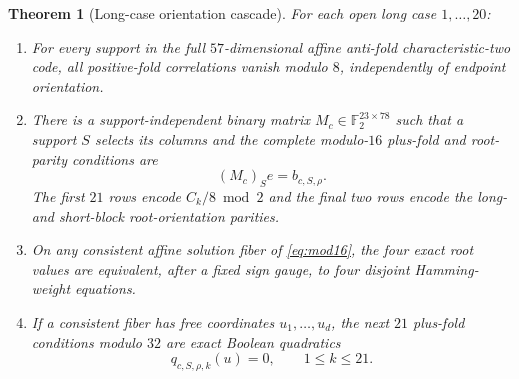 \documentclass[11pt]{article}
\newtheorem{theorem}{Theorem}[section]
\theoremstyle{remark}
\newcommand{\F}{\mathbb F}
\begin{document}
\begin{theorem}[Long-case orientation cascade]\label{thm:cascade}
For each open long case $1,\ldots,20$:
\begin{enumerate}
  \item For every support in the full $57$-dimensional affine anti-fold
        characteristic-two code, all positive-fold correlations vanish
        modulo $8$, independently of endpoint orientation.
  \item There is a support-independent binary matrix
        $M_c\in\F_2^{23\times78}$ such that a support $S$ selects its
        columns and the complete modulo-$16$ plus-fold and root-parity
        conditions are
        \[
        (M_c)_S e=b_{c,S,\rho}.                       \label{eq:mod16}
        \]
        The first $21$ rows encode $C_k/8\bmod2$ and the final two rows
        encode the long- and short-block root-orientation parities.
  \item On any consistent affine solution fiber of
        \eqref{eq:mod16}, the four exact root values are equivalent,
        after a fixed sign gauge, to four disjoint Hamming-weight
        equations.
  \item If a consistent fiber has free coordinates
        $u_1,\ldots,u_d$, the next $21$ plus-fold conditions modulo $32$
        are exact Boolean quadratics
        \[
        q_{c,S,\rho,k}(u)=0,\qquad 1\leq k\leq21.      \label{eq:mod32}
        \]
\end{enumerate}
\end{theorem}
\end{document}
